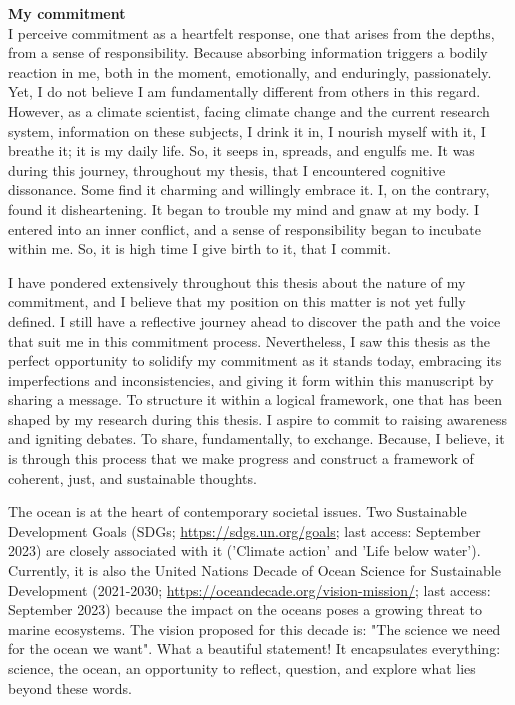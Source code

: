 {\noindent\Large\textbf{My commitment}}
\\

I perceive commitment as a heartfelt response, one that arises from the depths, from a sense of responsibility. Because absorbing information triggers a bodily reaction in me, both in the moment, emotionally, and enduringly, passionately. Yet, I do not believe I am fundamentally different from others in this regard. However, as a climate scientist, facing climate change and the current research system, information on these subjects, I drink it in, I nourish myself with it, I breathe it; it is my daily life. So, it seeps in, spreads, and engulfs me. It was during this journey, throughout my thesis, that I encountered cognitive dissonance. Some find it charming and willingly embrace it. I, on the contrary, found it disheartening. It began to trouble my mind and gnaw at my body. I entered into an inner conflict, and a sense of responsibility began to incubate within me. So, it is high time I give birth to it, that I commit.

I have pondered extensively throughout this thesis about the nature of my commitment, and I believe that my position on this matter is not yet fully defined. I still have a reflective journey ahead to discover the path and the voice that suit me in this commitment process. Nevertheless, I saw this thesis as the perfect opportunity to solidify my commitment as it stands today, embracing its imperfections and inconsistencies, and giving it form within this manuscript by sharing a message. To structure it within a logical framework, one that has been shaped by my research during this thesis. I aspire to commit to raising awareness and igniting debates. To share, fundamentally, to exchange. Because, I believe, it is through this process that we make progress and construct a framework of coherent, just, and sustainable thoughts.

The ocean is at the heart of contemporary societal issues. Two Sustainable Development Goals (SDGs; \url{https://sdgs.un.org/goals}; last access: September 2023) are closely associated with it ('Climate action' and 'Life below water'). Currently, it is also the United Nations Decade of Ocean Science for Sustainable Development (2021-2030; \url{https://oceandecade.org/vision-mission/}; last access: September 2023) because the impact on the oceans poses a growing threat to marine ecosystems. The vision proposed for this decade is: "The science we need for the ocean we want". What a beautiful statement! It encapsulates everything: science, the ocean, an opportunity to reflect, question, and explore what lies beyond these words.

